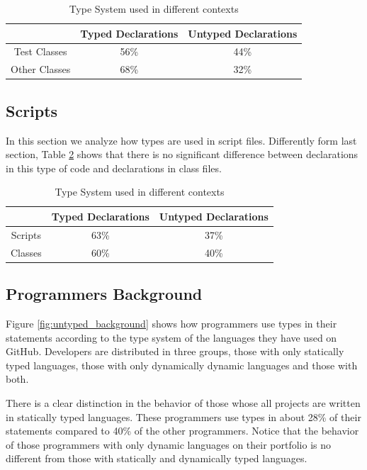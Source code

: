 \documentclass[preprint]{sigplanconf}
\begin{document}
\begin{table}[ht]
\caption{Type System used in different contexts}
\centering{}%
\begin{tabular}{|c|c|c|}
\hline 
 & Typed Declarations & Untyped Declarations\tabularnewline
\hline  
\hline 
Test Classes & 56\% & 44\%\tabularnewline
\hline 
Other Classes & 68\% & 32\%\tabularnewline
\hline 
\end{tabular}
\label{tab:tests}
\end{table}

\subsection{Scripts\label{sub:scripts}}
In this section we analyze how types are used in script files.
Differently form last section, Table \ref{tab:scritps} shows that there is no significant difference between declarations in this type of code and declarations in class files.

\begin{table}[ht]
\caption{Type System used in different contexts}


\centering{}%
\begin{tabular}{|c|c|c|}
\hline 
 & Typed Declarations & Untyped Declarations\tabularnewline
\hline 
\hline 
Scripts & 63\% & 37\%\tabularnewline
\hline 
Classes & 60\% & 40\%\tabularnewline
\hline 
\end{tabular}
\label{tab:scritps}
\end{table}



\subsection{Programmers Background\label{sub:background}}

Figure \ref{fig:untyped_background} shows how programmers use types in their statements according to the type system of the languages they have used on GitHub.
Developers are distributed in three groups, those with only statically typed languages, those with only dynamically dynamic languages and those with both. 

There is a clear distinction in the behavior of those whose all projects are written in statically typed languages.
These programmers use types in about 28\% of their statements compared to 40\% of the other programmers.
Notice that the behavior of those programmers with only dynamic languages on their portfolio is no different from those with statically and dynamically typed languages.
\end{document}
